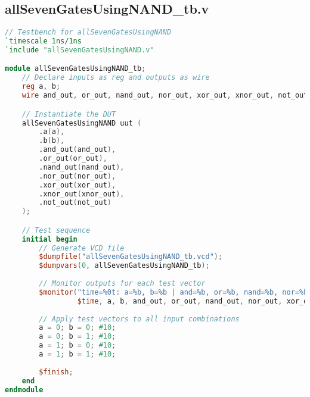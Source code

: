 \documentclass[a4paper,12pt]{article}
\begin{document}
\newpage

\subsection*{allSevenGatesUsingNAND_tb.v}
\begin{lstlisting}[language=Verilog, caption=allSevenGatesUsingNAND_tb.v]
// Testbench for allSevenGatesUsingNAND
`timescale 1ns/1ns
`include "allSevenGatesUsingNAND.v"

module allSevenGatesUsingNAND_tb;
    // Declare inputs as reg and outputs as wire
    reg a, b;
    wire and_out, or_out, nand_out, nor_out, xor_out, xnor_out, not_out;

    // Instantiate the DUT
    allSevenGatesUsingNAND uut (
        .a(a),
        .b(b),
        .and_out(and_out),
        .or_out(or_out),
        .nand_out(nand_out),
        .nor_out(nor_out),
        .xor_out(xor_out),
        .xnor_out(xnor_out),
        .not_out(not_out)
    );

    // Test sequence
    initial begin
        // Generate VCD file
        $dumpfile("allSevenGatesUsingNAND_tb.vcd");
        $dumpvars(0, allSevenGatesUsingNAND_tb);
        
        // Monitor outputs for each test vector
        $monitor("time=%0t: a=%b, b=%b | and=%b, or=%b, nand=%b, nor=%b, xor=%b, xnor=%b, not=%b", 
                 $time, a, b, and_out, or_out, nand_out, nor_out, xor_out, xnor_out, not_out);
                 
        // Apply test vectors to all input combinations
        a = 0; b = 0; #10;
        a = 0; b = 1; #10;
        a = 1; b = 0; #10;
        a = 1; b = 1; #10;
        
        $finish;
    end
endmodule

\end{lstlisting}

\newpage
\end{document}

